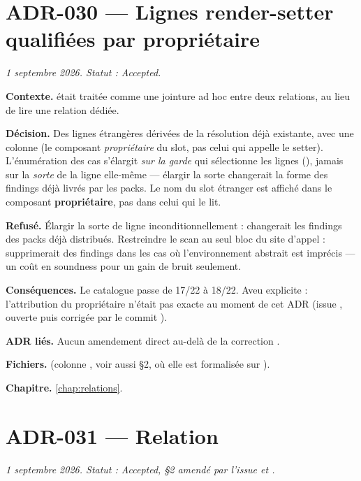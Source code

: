 \section{ADR-030 --- Lignes render-setter qualifiées par propriétaire}
\label{adr:30}
\noindent\textit{1{\ier} septembre 2026. Statut : Accepted.}

\textbf{Contexte.}  était traitée comme
une jointure ad hoc entre deux relations, au lieu de lire une relation dédiée.

\textbf{Décision.} Des lignes \og étrangères\fg{} dérivées de la résolution
 déjà existante, avec une colonne 
(le composant \emph{propriétaire} du slot, pas celui qui appelle le setter).
L'énumération des cas s'élargit \emph{sur la garde} qui sélectionne les lignes
(), jamais sur la \emph{sorte} de la ligne elle-même ---
élargir la sorte changerait la forme des findings déjà livrés par les packs.
Le nom du slot étranger est affiché dans le composant \textbf{propriétaire},
pas dans celui qui le lit.

\textbf{Refusé.} Élargir la sorte de ligne inconditionnellement : changerait
les findings des packs déjà distribués. Restreindre le scan au seul bloc du
site d'appel : supprimerait des findings dans les cas où l'environnement
abstrait est imprécis --- un coût en soundness pour un gain de bruit
seulement.

\textbf{Conséquences.} Le catalogue passe de 17/22 à 18/22. Aveu explicite :
l'attribution du propriétaire n'était pas exacte au moment de cet ADR
(issue , ouverte puis corrigée par le commit ).

\textbf{ADR liés.} Aucun amendement direct au-delà de la correction
.

\textbf{Fichiers.}  (colonne , voir
aussi  §2, où elle est formalisée sur ).

\textbf{Chapitre.} \cref{chap:relations}.

\section{ADR-031 --- Relation }
\label{adr:31}
\noindent\textit{1{\ier} septembre 2026. Statut : Accepted, §2 amendé par l'issue  et .}

